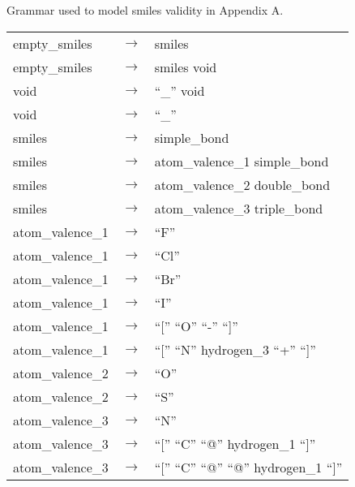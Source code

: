 

\label{annex:grammar-validity}

Grammar used to model \gls{smiles} validity in Appendix A\@.

\footnotesize
\begin{longtable}{m{} p{} p{}}
    empty\_smiles & $\rightarrow$ & smiles \\
    empty\_smiles & $\rightarrow$ & smiles void \\
    void & $\rightarrow$ & ``\_'' void \\
    void & $\rightarrow$ & ``\_'' \\
    smiles & $\rightarrow$ & simple\_bond \\
    smiles & $\rightarrow$ & atom\_valence\_1 simple\_bond \\
    smiles & $\rightarrow$ & atom\_valence\_2 double\_bond \\
    smiles & $\rightarrow$ & atom\_valence\_3 triple\_bond \\
    atom\_valence\_1 & $\rightarrow$ & ``F'' \\
    atom\_valence\_1 & $\rightarrow$ & ``Cl'' \\
    atom\_valence\_1 & $\rightarrow$ & ``Br'' \\
    atom\_valence\_1 & $\rightarrow$ & ``I'' \\
    atom\_valence\_1 & $\rightarrow$ & ``['' ``O'' ``-'' ``]'' \\
    atom\_valence\_1 & $\rightarrow$ & ``['' ``N'' hydrogen\_3 ``+'' ``]'' \\
    atom\_valence\_2 & $\rightarrow$ & ``O'' \\
    atom\_valence\_2 & $\rightarrow$ & ``S'' \\
    atom\_valence\_3 & $\rightarrow$ & ``N'' \\
    atom\_valence\_3 & $\rightarrow$ & ``['' ``C'' ``@'' hydrogen\_1 ``]'' \\
    atom\_valence\_3 & $\rightarrow$ & ``['' ``C'' ``@'' ``@'' hydrogen\_1 ``]'' \\

\end{longtable}
